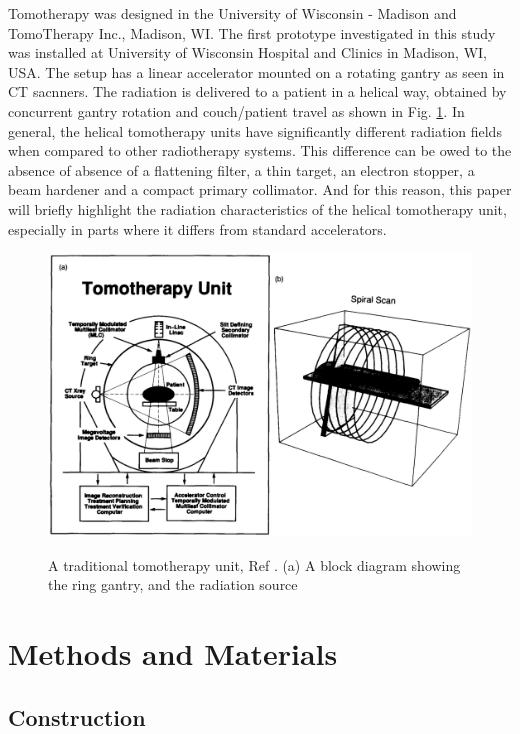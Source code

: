 \documentclass[12pt,journal,compsoc]{IEEEtran} %
\begin{document}
  Tomotherapy was designed in the University of Wisconsin - Madison and 
  TomoTherapy Inc., Madison, WI. The first prototype investigated in this study 
  was installed at University of Wisconsin Hospital and Clinics in Madison, WI, 
  USA. 
  The setup has a linear accelerator mounted on a rotating gantry as seen in CT 
  sacnners. The radiation is delivered to a patient in a helical way, obtained 
  by concurrent gantry rotation and couch/patient travel as shown in Fig. 
  \ref{fig1}. In general, the helical tomotherapy units have significantly 
  different radiation fields when compared to other radiotherapy systems. This 
  difference can be owed to the absence of absence of a flattening filter, a 
  thin target, an electron stopper, a beam hardener and a compact primary 
  collimator. And for this reason, this paper will briefly highlight the 
  radiation characteristics of the helical tomotherapy unit, especially in 
  parts where it differs from standard accelerators.
  \begin{figure}[t!]
	\includegraphics[width=\linewidth]{fig1}
  \label{fig1}
  \caption{A traditional tomotherapy unit, Ref \cite{Mackie1993}. (a) A block 
  diagram showing the ring gantry, and the radiation source}
  \end{figure}
  
  \section{Methods and Materials}
  \subsection{Construction}
\end{document}
